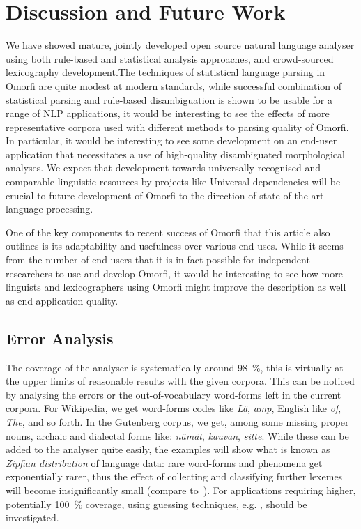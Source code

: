 \documentclass[preprint]{flammie}
\begin{document}
\section{Discussion and Future Work}
\label{sec:discussion}

We have showed mature, jointly developed open source natural language analyser
using both rule-based and statistical analysis approaches, and crowd-sourced
lexicography development.The techniques of statistical language parsing in
Omorfi are quite modest at modern standards, while successful combination of
statistical parsing and rule-based disambiguation is shown to be usable for a
range of NLP applications, it would be interesting to see the effects of more
representative corpora used with different methods to parsing quality of
Omorfi.  In particular, it would be interesting to see some development on an
end-user application that necessitates a use of high-quality disambiguated
morphological analyses.  We expect that development towards universally
recognised and comparable linguistic resources by projects like Universal
dependencies will be crucial to future development of Omorfi to the direction
of state-of-the-art language processing.

One of the key components to recent success of Omorfi that this article also
outlines is its adaptability and usefulness over various end uses.  While it
seems from the number of end users that it is in fact possible for independent
researchers to use and develop Omorfi, it would be interesting to see how more
linguists and lexicographers using Omorfi might improve the description as well
as end application quality.

\subsection{Error Analysis}

The coverage of the analyser is systematically around 98~\%, this is virtually
at the upper limits of reasonable results with the given corpora.  This can be
noticed by analysing the errors or the out-of-vocabulary word-forms left in the
current corpora. For Wikipedia, we get word-forms codes like \textit{Lä},
\textit{amp}, English like \textit{of}, \textit{The}, and so forth. In the
Gutenberg corpus, we get, among some missing proper nouns, archaic and
dialectal forms like: \textit{nämät}, \textit{kauvan}, \textit{sitte}.  While
these can be added to the analyser quite easily, the  examples will show what
is known as \textit{Zipfian distribution} of language data: rare word-forms and
phenomena get exponentially rarer, thus the effect of collecting and
classifying further lexemes will become insignificantly small (compare
to~\citet{manning2011part}). For applications requiring higher, potentially
100~\% coverage, using guessing techniques, e.g. \citet{mikheev1997automatic},
should be investigated.
\end{document}
